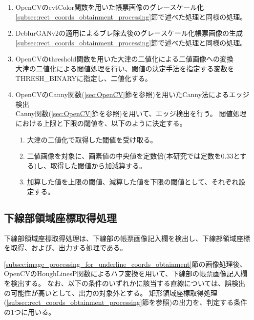 \begin{enumerate}
    \item OpenCVのcvtColor関数を用いた帳票画像のグレースケール化\\
        \ref{subsec:rect_coords_obtainment_processing}節で述べた処理と同様の処理。
    \item DeblurGANv2の適用によるブレ除去後のグレースケール化帳票画像の生成\\
        \ref{subsec:rect_coords_obtainment_processing}節で述べた処理と同様の処理。
    \item OpenCVのthreshold関数を用いた大津の二値化による二値画像への変換\\
        大津の二値化による閾値処理を行い、閾値の決定手法を指定する変数をTHRESH\_BINARYに指定し、二値化する。
    \item OpenCVのCanny関数(\ref{sec:OpenCV}節を参照)を用いたCanny法によるエッジ検出\\
        Canny関数(\ref{sec:OpenCV}節を参照)を用いて、エッジ検出を行う。
        閾値処理における上限と下限の閾値を、以下のように決定する。
        \begin{enumerate}
            \item 大津の二値化で取得した閾値を受け取る。
            \item 二値画像を対象に、画素値の中央値を定数倍(本研究では定数を0.33とする)し、取得した閾値から加減算する。
            \item 加算した値を上限の閾値、減算した値を下限の閾値として、それぞれ設定する。
        \end{enumerate}
\end{enumerate}


\subsection{下線部領域座標取得処理}\label{subsec:underline_coords_obtainment_processing}
下線部領域座標取得処理は、下線部の帳票画像記入欄を検出し、下線部領域座標を取得、および、出力する処理である。

\ref{subsec:image_processing_for_underline_coords_obtainment}節の画像処理後、OpenCVのHoughLinesP関数によるハフ変換を用いて、下線部の帳票画像記入欄を検出する。
なお、以下の条件のいずれかに該当する直線については、誤検出の可能性が高いとして、出力の対象外とする。
矩形領域座標取得処理(\ref{subsec:rect_coords_obtainment_processing}節を参照)の出力を、判定する条件の1つに用いる。

